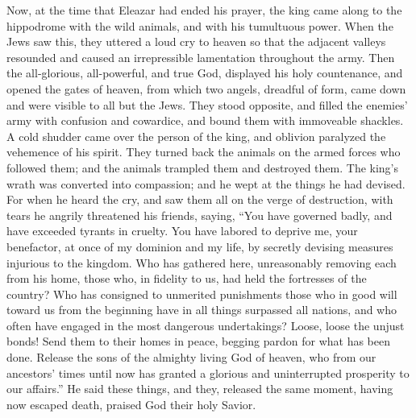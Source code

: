  Now, at the time that Eleazar had ended his prayer, the
king came along to the hippodrome with the wild animals, and with his
tumultuous power.  When the Jews saw this, they uttered a
loud cry to heaven so that the adjacent valleys resounded and caused an
irrepressible lamentation throughout the army.  Then the
all-glorious, all-powerful, and true God, displayed his holy
countenance, and opened the gates of heaven, from which two angels,
dreadful of form, came down and were visible to all but the Jews.
 They stood opposite, and filled the enemies' army with
confusion and cowardice, and bound them with immoveable shackles.
 A cold shudder came over the person of the king, and
oblivion paralyzed the vehemence of his spirit.  They
turned back the animals on the armed forces who followed them; and the
animals trampled them and destroyed them.  The king's
wrath was converted into compassion; and he wept at the things he had
devised.  For when he heard the cry, and saw them all on
the verge of destruction, with tears he angrily threatened his friends,
saying,  ``You have governed badly, and have exceeded
tyrants in cruelty. You have labored to deprive me, your benefactor, at
once of my dominion and my life, by secretly devising measures injurious
to the kingdom.  Who has gathered here, unreasonably
removing each from his home, those who, in fidelity to us, had held the
fortresses of the country?  Who has consigned to
unmerited punishments those who in good will toward us from the
beginning have in all things surpassed all nations, and who often have
engaged in the most dangerous undertakings?  Loose, loose
the unjust bonds! Send them to their homes in peace, begging pardon for
what has been done.  Release the sons of the almighty
living God of heaven, who from our ancestors' times until now has
granted a glorious and uninterrupted prosperity to our affairs.''
 He said these things, and they, released the same
moment, having now escaped death, praised God their holy Savior.

